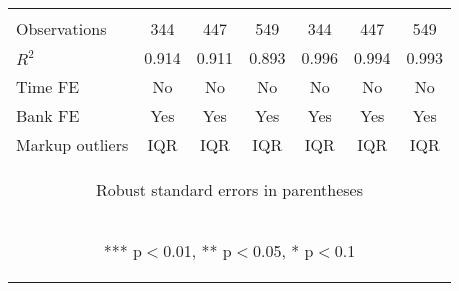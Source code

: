 \documentclass[]{article}
\begin{document}
\begin{center}
\begin{tabular}{lcccccc}
\vspace{4pt} & \begin{footnotesize}\end{footnotesize} & \begin{footnotesize}\end{footnotesize} & \begin{footnotesize}\end{footnotesize} & \begin{footnotesize}\end{footnotesize} & \begin{footnotesize}\end{footnotesize} & \begin{footnotesize}\end{footnotesize} \\
Observations & 344 & 447 & 549 & 344 & 447 & 549 \\
$R^2$ & 0.914 & 0.911 & 0.893 & 0.996 & 0.994 & 0.993 \\
Time FE & No & No & No & No & No & No \\
Bank FE & Yes & Yes & Yes & Yes & Yes & Yes \\
 Markup outliers & IQR & IQR & IQR & IQR & IQR & IQR \\ \hline
\multicolumn{7}{c}{\begin{footnotesize} Robust standard errors in parentheses\end{footnotesize}} \\
\multicolumn{7}{c}{\begin{footnotesize} *** p$<$0.01, ** p$<$0.05, * p$<$0.1\end{footnotesize}} \\
\end{tabular}
\end{center}
\end{document}
